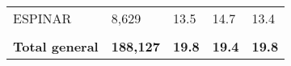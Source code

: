 \begin{tabular}{lllll}
	\cellcolor[HTML]{FF5050}ESPINAR                                & 8,629                                                                 & 13.5                                                                             & 14.7                                                                        & 13.4                                                                                \\
	&                                                                       &                                                                                  &                                                                             &                                                                                     \\
	\rowcolor[HTML]{DDEBF7} 
	\textbf{Total   general}                                       & \textbf{188,127}                                                      & \textbf{19.8}                                                                    & \textbf{19.4}                                                               & \textbf{19.8}                                                                      
\end{tabular}